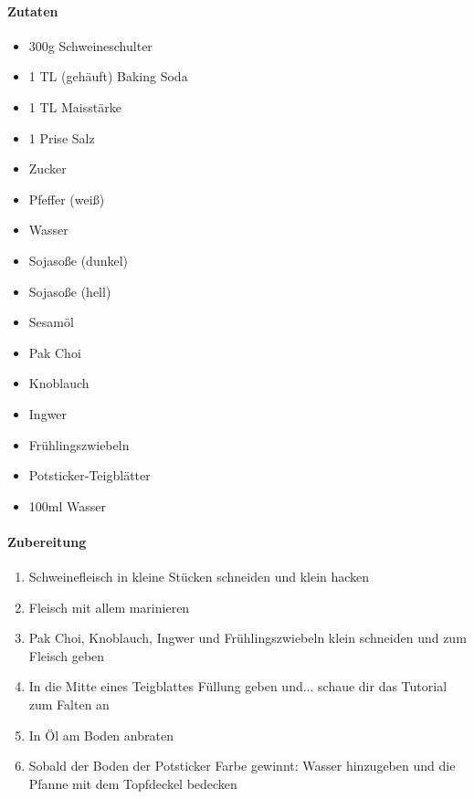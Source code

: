 \newpage
{}
\paragraph{Zutaten}
\begin{itemize}[noitemsep]
	\item 300g Schweineschulter
	\item 1 TL (gehäuft) Baking Soda
	\item 1 TL Maisstärke
	\item 1 Prise Salz
	\item Zucker
	\item Pfeffer (weiß)
	\item Wasser
	\item Sojasoße (dunkel)
	\item Sojasoße (hell)
	\item Sesamöl
	\item Pak Choi
	\item Knoblauch 
	\item Ingwer
	\item Frühlingszwiebeln 
	\item Potsticker-Teigblätter
	\item 100ml Wasser 
\end{itemize}
\paragraph{Zubereitung}
\begin{enumerate}[noitemsep]
	\item Schweinefleisch in kleine Stücken schneiden und klein hacken
	\item Fleisch mit allem marinieren
	\item Pak Choi, Knoblauch, Ingwer und Frühlingszwiebeln klein schneiden und zum Fleisch geben 
	\item In die Mitte eines Teigblattes Füllung geben und... schaue dir das Tutorial zum Falten an
	\item In Öl am Boden anbraten
	\item Sobald der Boden der Potsticker Farbe gewinnt: Wasser hinzugeben und die Pfanne mit dem Topfdeckel bedecken
\end{enumerate}